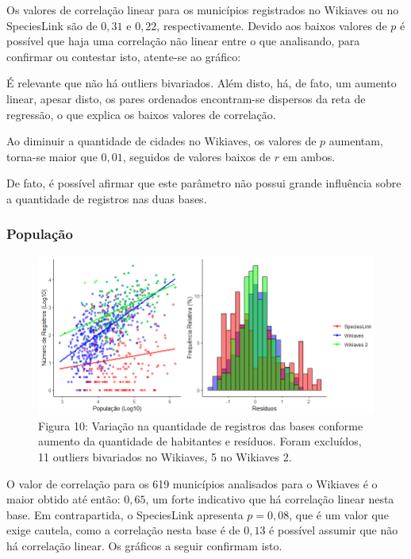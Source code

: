 \documentclass[12pt]{extarticle}
\newenvironment{resposta}{ \color{mygray}}{}
\begin{document}
\begin{resposta}
 Os valores de correlação linear para os municípios registrados no Wikiaves ou no SpeciesLink são de $0,31$ e $0,22$, respectivamente. Devido aos baixos valores de $p$ é possível que haja uma correlação não linear entre o que analisando, para confirmar ou contestar isto, atente-se ao gráfico: 
 
 É relevante que não há outliers bivariados. Além disto, há, de fato, um aumento linear, apesar disto, os pares ordenados encontram-se dispersos da reta de regressão, o que explica os baixos valores de correlação.

Ao diminuir a quantidade de cidades no Wikiaves, os valores de $p$ aumentam, torna-se maior que $0,01$, seguidos de valores baixos de $r$ em ambos. 

De fato, é possível afirmar que este parâmetro não possui grande influência sobre a quantidade de registros nas duas bases.
\end{resposta}



\subsubsection{População}

\begin{figure}[h!]
\centering
\includegraphics[width = 15cm]{Imagens/G03.png}
\\{\scriptsize Figura 10: Variação na quantidade de registros das bases conforme aumento da quantidade de habitantes e resíduos. Foram excluídos, 11 outliers bivariados no Wikiaves, 5 no Wikiaves 2.}
\end{figure}

\begin{resposta}
 O valor de correlação para os 619 municípios analisados para o Wikiaves é o maior obtido até então: $0,65$, um forte indicativo que há correlação linear nesta base. Em contrapartida, o SpeciesLink apresenta $p = 0,08$, que é um valor que exige cautela, como a correlação nesta base é de $0,13$ é possível assumir que não há correlação linear. Os gráficos a seguir confirmam isto.
 
\end{resposta}
\end{document}
